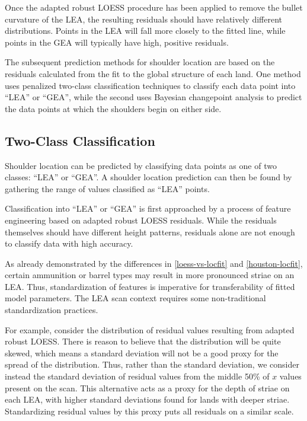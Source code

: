 \documentclass[12pt]{article}
\begin{document}
Once the adapted robust LOESS procedure has been applied to remove the
bullet curvature of the LEA, the resulting residuals should have
relatively different distributions. Points in the LEA will fall more
closely to the fitted line, while points in the GEA will typically have
high, positive residuals.

The subsequent prediction methods for shoulder location are based on the
residuals calculated from the fit to the global structure of each land.
One method uses penalized two-class classification techniques to
classify each data point into ``LEA'' or ``GEA'', while the second uses
Bayesian changepoint analysis to predict the data points at which the
shoulders begin on either side.

\subsection{Two-Class Classification}

Shoulder location can be predicted by classifying data points as one of
two classes: ``LEA'' or ``GEA''. A shoulder location prediction can then
be found by gathering the range of values classified as ``LEA'' points.

Classification into ``LEA'' or ``GEA'' is first approached by a process
of feature engineering based on adapted robust LOESS residuals. While
the residuals themselves should have different height patterns,
residuals alone are not enough to classify data with high accuracy.

As already demonstrated by the differences in \autoref{loess-vs-locfit}
and \autoref{houston-locfit}, certain ammunition or barrel types may
result in more pronounced striae on an LEA. Thus, standardization of
features is imperative for transferability of fitted model parameters.
The LEA scan context requires some non-traditional standardization
practices.

For example, consider the distribution of residual values resulting from
adapted robust LOESS. There is reason to believe that the distribution
will be quite skewed, which means a standard deviation will not be a
good proxy for the spread of the distribution. Thus, rather than the
standard deviation, we consider instead the standard deviation of
residual values from the middle 50\% of \(x\) values present on the
scan. This alternative acts as a proxy for the depth of striae on each
LEA, with higher standard deviations found for lands with deeper striae.
Standardizing residual values by this proxy puts all residuals on a
similar scale.
\end{document}
